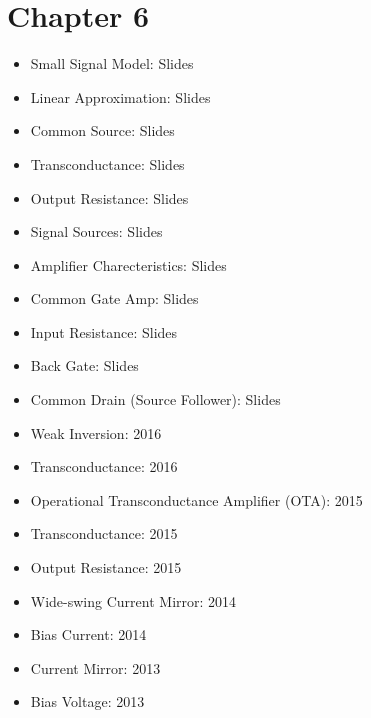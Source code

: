 \documentclass[twocolumn]{article}
\begin{document}
  \section*{Chapter 6}
    \begin{itemize}
      \item Small Signal Model: Slides
      \item Linear Approximation: Slides
      \item Common Source: Slides
      \item Transconductance: Slides
      \item Output Resistance: Slides
      \item Signal Sources: Slides
      \item Amplifier Charecteristics: Slides
      \item Common Gate Amp: Slides
      \item Input Resistance: Slides
      \item Back Gate: Slides
      \item Common Drain (Source Follower): Slides

      \item Weak Inversion: 2016
      \item Transconductance: 2016

      \item Operational Transconductance Amplifier (OTA): 2015
      \item Transconductance: 2015
      \item Output Resistance: 2015

      \item Wide-swing Current Mirror: 2014
      \item Bias Current: 2014

      \item Current Mirror: 2013
      \item Bias Voltage: 2013
    \end{itemize}
\end{document}
